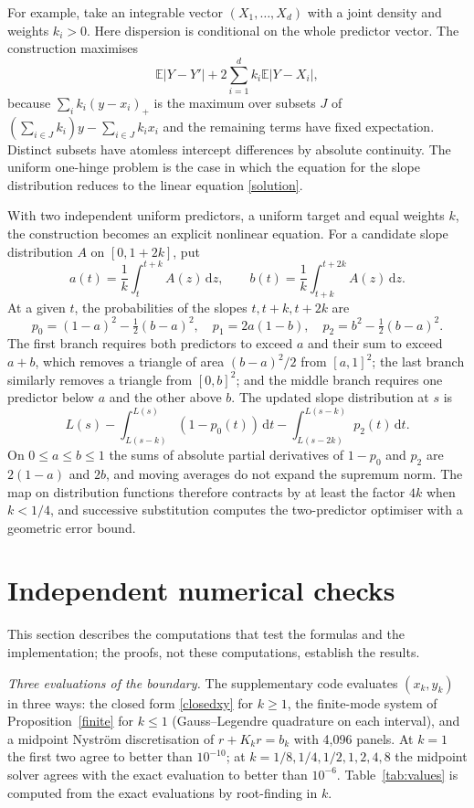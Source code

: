 \documentclass[11pt,a4paper]{article}
\theoremstyle{remark}
\newcommand{\E}{\mathbb E}
\newcommand{\1}{\mathbf 1}
\newcommand{\dd}{\,\mathrm d}
\begin{document}
For example, take an integrable vector $(X_1,\ldots,X_d)$ with a joint density and weights $k_i>0$. Here dispersion is conditional on the whole predictor vector. The construction maximises
\[
 \E|Y-Y'|+2\sum_{i=1}^d k_i\E|Y-X_i|,
\]
because $\sum_i k_i(y-x_i)_+$ is the maximum over subsets $J$ of $(\sum_{i\in J} k_i)y-\sum_{i\in J} k_i x_i$ and the remaining terms have fixed expectation. Distinct subsets have atomless intercept differences by absolute continuity. The uniform one-hinge problem is the case in which the equation for the slope distribution reduces to the linear equation \eqref{solution}.

With two independent uniform predictors, a uniform target and equal weights $k$, the construction becomes an explicit nonlinear equation. For a candidate slope distribution $A$ on $[0,1+2k]$, put
\[
 a(t)=\frac1k\int_t^{t+k}A(z)\dd z,\qquad
 b(t)=\frac1k\int_{t+k}^{t+2k}A(z)\dd z.
\]
At a given $t$, the probabilities of the slopes $t,t+k,t+2k$ are
\[
 p_0=(1-a)^2-\tfrac12(b-a)^2,\quad
 p_1=2a(1-b),\quad p_2=b^2-\tfrac12(b-a)^2.
\]
The first branch requires both predictors to exceed $a$ and their sum to exceed $a+b$, which removes a triangle of area $(b-a)^2/2$ from $[a,1]^2$; the last branch similarly removes a triangle from $[0,b]^2$; and the middle branch requires one predictor below $a$ and the other above $b$. The updated slope distribution at $s$ is
\[
 L(s)-\int_{L(s-k)}^{L(s)}(1-p_0(t))\dd t
     -\int_{L(s-2k)}^{L(s-k)}p_2(t)\dd t .
\]
On $0\le a\le b\le1$ the sums of absolute partial derivatives of $1-p_0$ and $p_2$ are $2(1-a)$ and $2b$, and moving averages do not expand the supremum norm. The map on distribution functions therefore contracts by at least the factor $4k$ when $k<1/4$, and successive substitution computes the two-predictor optimiser with a geometric error bound.

\section{Independent numerical checks}\label{sec:numerics}
This section describes the computations that test the formulas and the implementation; the proofs, not these computations, establish the results.

\emph{Three evaluations of the boundary.} The supplementary code evaluates $(x_k,y_k)$ in three ways: the closed form \eqref{closedxy} for $k\ge1$, the finite-mode system of Proposition~\ref{finite} for $k\le1$ (Gauss--Legendre quadrature on each interval), and a midpoint Nystr\"om discretisation of $r+K_kr=b_k$ with 4,096 panels. At $k=1$ the first two agree to better than $10^{-10}$; at $k=1/8,1/4,1/2,1,2,4,8$ the midpoint solver agrees with the exact evaluation to better than $10^{-6}$. Table~\ref{tab:values} is computed from the exact evaluations by root-finding in $k$.
\end{document}

